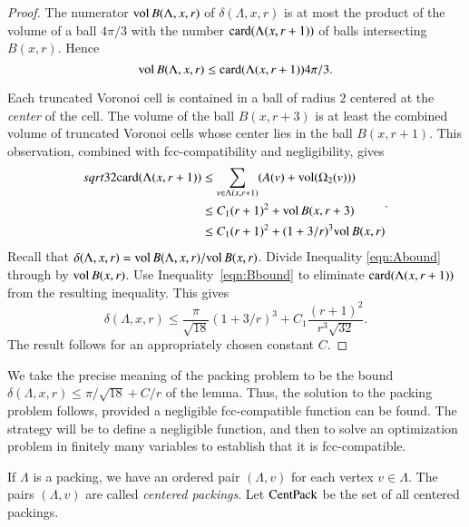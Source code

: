 \begin{proof}
The numerator ${\operatorname{vol}}\, B(\Lambda,x,r)$ of $\delta(\Lambda,x,r)$
is at most the product of the volume of a ball $4\pi/3$ with the
number ${\operatorname{card}}(\Lambda(x,r+1))$ of balls intersecting $B(x,r)$.  Hence
    \begin{equation}
    {\operatorname{vol}}\, B(\Lambda,x,r) \le {\operatorname{card}}(\Lambda(x,r+1)) 4\pi/3.
    \label{eqn:Abound}
    \end{equation}

Each truncated Voronoi cell is contained in a ball of
radius $2$ centered at the {\it center} of the cell.  The volume
of the ball $B(x,r+3)$ is at least the combined volume of 
truncated Voronoi
cells whose center lies in the ball $B(x,r+1)$. This observation,
combined with fcc-compatibility and negligibility, gives
    \begin{equation}
    \begin{split}
    sqrt{32}{\operatorname{card}}(\Lambda(x,r+1))
    &\le \sum_{v\in\Lambda(x,r+1)} (A(v) +
    {\operatorname{vol}}(\Omega_2(v))) \\
    &\le C_1 (r+1)^2 + {\operatorname{vol}}\,B(x,r+3) \\
    &\le C_1 (r+1)^2 + (1+3/r)^3 {\operatorname{vol}}\,B(x,r)
    \label{eqn:Bbound}
    \end{split}.
    \end{equation}
Recall that $\delta(\Lambda,x,r)=
{\operatorname{vol}}\,B(\Lambda,x,r)/{\operatorname{vol}}\,B(x,r)$. Divide Inequality
\ref{eqn:Abound} through by ${\operatorname{vol}}\,B(x,r)$.  Use
Inequality~\ref{eqn:Bbound} to eliminate ${\operatorname{card}}(\Lambda(x,r+1))$ from the
resulting inequality.  This gives
    $$\delta(\Lambda,x,r)
        \le \frac{\pi}{\sqrt{18}} (1+3/r)^3 + C_1 \frac{(r+1)^2}{r^3\sqrt{32}}.
    $$
The result follows for an appropriately chosen constant $C$.
\end{proof}

\begin{remark} \label{remark:precise}
We take the precise meaning of the packing problem to be the
bound $\delta(\Lambda,x,r) \le \pi/\sqrt{18} + C/r$ of the lemma.
Thus, the solution to the packing problem follows, provided a negligible
fcc-compatible function can be found. The strategy will be to
define a negligible function, and then to solve an optimization
problem in finitely many variables to establish that it is
fcc-compatible.
\end{remark}

If $\Lambda$ is a %
packing, we have an ordered pair
$(\Lambda,v)$ for each vertex $v\in\Lambda$.  The pairs
$(\Lambda,v)$ are called {\it centered packings}.
Let ${\operatorname{CentPack}}$ be the set of all centered packings.


